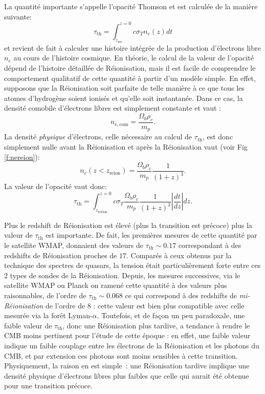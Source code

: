 La quantité importante s'appelle l'opacité Thomson et est calculée de la manière suivante:
\begin{equation}
\tau_\mathrm{th}=\int_{z_\mathrm{rec}}^{z=0} c \sigma_T n_e(z) dt
\end{equation}
et revient de fait à calculer une histoire intégrée de la production d'électrons libre $n_e$ au cours de l'histoire cosmique. En théorie, le calcul de la valeur de l'opacité dépend de l'histoire détaillée de Réionisation, mais il est facile de comprendre le comportement qualitatif de cette quantité à partir d'un modèle simple. En effet, supposons que la Réionisation soit parfaite de telle manière à ce que tous les atomes d'hydrogène soient ionisés et qu'elle soit instantanée. Dans ce cas, la densité comobile d'électrons libres est simplement constante et vaut :
\begin{equation}
n_\mathrm{e,com}=\frac{\Omega_b \rho_c}{m_p}.
\end{equation}
La densité \textit{physique} d'électrons, celle nécessaire au calcul de $\tau_\mathrm{th}$, est donc simplement nulle avant la Réionisation et après la Réionisation vaut (voir Fig \ref{f:nereion}):
\begin{equation}
n_e(z<z_\mathrm{reion})=\frac{\Omega_b \rho_c}{m_p} \frac{1}{(1+z)^3}.
\end{equation}
La valeur de l'opacité vaut donc:
\begin{equation}
\tau_\mathrm{th}=\int_{z_\mathrm{rerion}}^{z=0} c \sigma_T\frac{\Omega_b \rho_c}{m_p} \frac{1}{(1+z)^3}  |\frac{dt}{dz}| dz.
\end{equation}

Plus le redshift de Réionisation est élevé (plus la transition est précoce) plus la valeur de $\tau_\mathrm{th}$ est importante. De fait, les premières mesures de cette quantité par le satellite WMAP, donnaient des valeurs de $\tau_\mathrm{th}\sim 0.17$ correspondant à des redshifts de Réionisation proches de $17$. Comparés à ceux obtenus par la technique des spectres de quasars, la tension était particulièrement forte entre ces 2 types de sondes de la Réionisation. Depuis, les mesures successives, via le satellite WMAP ou Planck on ramené cette quantité à des valeurs plus raisonnables, de l'ordre de $\tau_\mathrm{th}\sim 0.068$ ce qui correspond à des redshifts de \textit{mi-Réionisation} de l'ordre de 8 : cette valeur est bien plus compatible avec celle mesurée via la forêt Lyman-$\alpha$. Toutefois, et de façon un peu paradoxale, une faible valeur de $\tau_\mathrm{th}$, donc une Réionisation plus tardive, a tendance à rendre le CMB moins pertinent pour l'étude de cette époque : en effet, une faible valeur indique un faible couplage entre les électrons de la Réionisation et les photons du CMB, et par extension ces photons sont moins sensibles à cette transition. Physiquement, la raison en est simple~: une Réionisation tardive implique une densité physique d'électrons libres plus faibles que celle qui aurait été obtenue pour une transition précoce.

